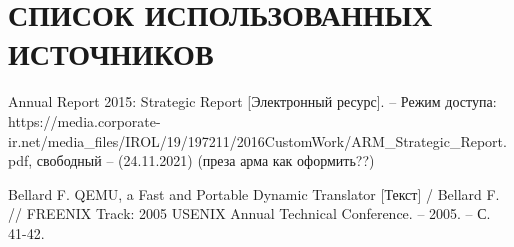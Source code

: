 \section*{СПИСОК ИСПОЛЬЗОВАННЫХ ИСТОЧНИКОВ}

\begingroup
\renewcommand{\section}[2]{}
\begin{thebibliography}{}
	Annual Report 2015: Strategic Report [Электронный ресурс]. – Режим доступа: https://media.corporate-ir.net/media\_files/IROL/19/197211/2016CustomWork/ARM\_Strategic\_Report.pdf,
	свободный – (24.11.2021) (преза арма как оформить??)
	
	Bellard F. QEMU, a Fast and Portable Dynamic Translator [Текст]  / Bellard F. // FREENIX Track: 2005 USENIX Annual Technical Conference. – 2005. – С. 41-42.
\end{thebibliography}
\endgroup

\pagebreak